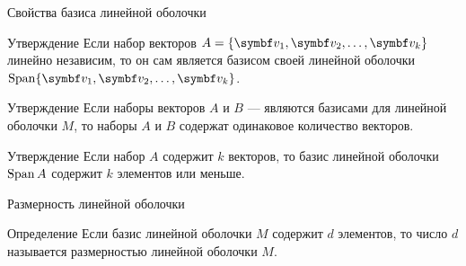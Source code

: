 \begin{frame}{Свойства базиса линейной оболочки}

\begin{block}{Утверждение}
Если набор векторов $A =\{ \bv_1, \bv_2, \ldots, \bv_k\}$ линейно независим, то он сам
является базисом своей линейной оболочки $\Span  \{ \bv_1, \bv_2, \ldots, \bv_k\}$.
\end{block}


\pause
\begin{block}{Утверждение}
Если наборы векторов $A$ и $B$ — являются базисами для линейной оболочки $M$,
то наборы $A$ и $B$ содержат одинаковое количество векторов. 
\end{block}
  
\pause
\begin{block}{Утверждение}
Если набор $A$ содержит $k$ векторов, 
то базис линейной оболочки $\operatorname{Span} A$ содержит $k$ элементов или меньше. 
\end{block}
  


\end{frame}


\begin{frame}{Размерность линейной оболочки}

\begin{block}{Определение}
  Если базис линейной оболочки $M$ содержит $d$ элементов, то 
  число $d$ называется размерностью линейной оболочки $M$. 
\end{block}
    

\end{frame}



